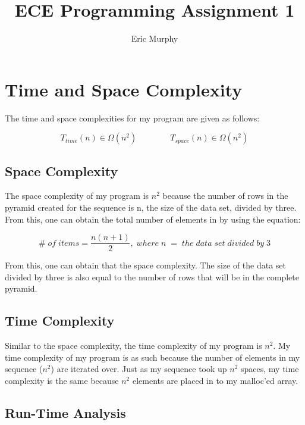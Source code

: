 \documentclass{article}
\begin{document}
\author{Eric Murphy\vspace{-2ex}}
\title{ECE Programming Assignment 1}

\maketitle

\section*{Time and Space Complexity}

\indent The time and space complexities for my program are given as follows:

\begin{equation*}
  T_{time}(n) \in \Omega (n^2) \qquad \qquad
  T_{space}(n) \in \Omega (n^2)
\end{equation*}

\subsection*{Space Complexity}

The space complexity of my program is \( n^2 \) because the number of rows in the pyramid created for the sequence is n, the size of the data set, divided by three.
From this, one can obtain the total number of elements in by using the equation:

\begin{equation*}
  \# \; of \; items = \frac{n(n+1)}{2}, \; where \; n \; = \; the \; data \; set \; divided \; by \; 3
\end{equation*}

\noindent From this, one can obtain that the space complexity.  The size of the data set divided by three is also equal to the number of rows that will be in the complete pyramid.

\subsection*{Time Complexity}

Similar to the space complexity, the time complexity of my program is \( n^2 \).  My time complexity of my program is as such because the number of elements in my sequence (\( n^2 \)) are iterated over.
Just as my sequence took up \( n^2 \) spaces, my time complexity is the same because \( n^2 \) elements are placed in to my malloc'ed array.

\subsection*{Run-Time Analysis}
\end{document}
